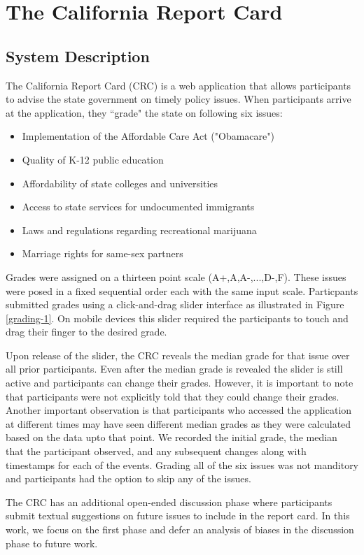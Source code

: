 \section{The California Report Card}
\subsection{System Description}
The California Report Card (CRC) is a web application that allows participants to advise the state government on timely policy issues.
When participants arrive at the application, they ``grade" the state on following six issues:
\begin{itemize}
\item Implementation of the Affordable Care Act ("Obamacare")
\item Quality of K-12 public education
\item Affordability of state colleges and universities
\item Access to state services for undocumented immigrants
\item Laws and regulations regarding recreational marijuana
\item Marriage rights for same-sex partners
\end{itemize}
Grades were assigned on a thirteen point scale (A+,A,A-,...,D-,F).
These issues were posed in a fixed sequential order each with the same input scale.
Particpants submitted grades using a click-and-drag slider interface as illustrated in Figure \ref{grading-1}.
On mobile devices this slider required the participants to touch and drag their finger to the desired grade.

Upon release of the slider, the CRC reveals the median grade for that issue over all prior participants.
Even after the median grade is revealed the slider is still active and participants can change their grades.
However, it is important to note that participants were not explicitly told that they could change their grades.
Another important observation is that participants who accessed the application at different times may have seen different median grades as they were calculated based on the data upto that point.
We recorded the initial grade, the median that the participant observed, and any subsequent changes along with timestamps for each of the events. 
Grading all of the six issues was not manditory and participants had the option to skip any of the issues.

The CRC has an additional open-ended discussion phase where participants submit textual suggestions on future issues to include in the report card.
In this work, we focus on the first phase and defer an analysis of biases in the discussion phase to future work.

